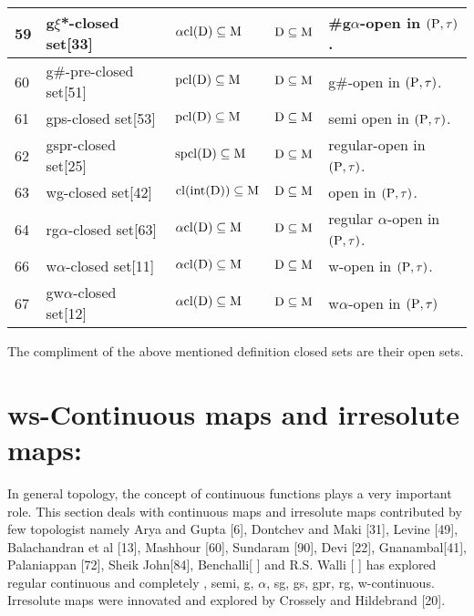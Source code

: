 {\begin{longtable}{|p{1cm}|>{\raggedright}p{5cm}|>{\centering}p{2.5cm}|>{\centering}p{1.7cm}|>{\centering}p{2.8cm}|}
\hline
59 & g$\xi$*-closed set[33]  & $\alpha\mathrm{cl}(\mathrm{D}) \subseteq \mathrm{M}$ & $\mathrm{D}  \subseteq  \mathrm{M}$ & \#g$\alpha$-open in $(\mathrm{P}, \tau)$.\tabularnewline
\hline
60 & g\#-pre-closed set[51] &  $\mathrm{pcl}(\mathrm{D}) \subseteq \mathrm{M}$ & $\mathrm{D}  \subseteq  \mathrm{M}$ & g\#-open in $(\mathrm{P}, \tau)$.\tabularnewline
\hline
61 & gps-closed set[53] & $\mathrm{pcl}(\mathrm{D}) \subseteq \mathrm{M}$ & $\mathrm{D}  \subseteq  \mathrm{M}$ & semi open in $(\mathrm{P}, \tau)$.\tabularnewline
\hline
62 & gspr-closed set[25]  & $\mathrm{spcl}(\mathrm{D}) \subseteq \mathrm{M}$ & $\mathrm{D}  \subseteq  \mathrm{M}$ & regular-open in $(\mathrm{P}, \tau)$.\tabularnewline
\hline
63 & wg-closed set[42]  & $\mathrm{cl}(\mbox{int}(\mathrm{D})) \subseteq \mathrm{M}$ & $\mathrm{D}  \subseteq  \mathrm{M}$ & open in $(\mathrm{P}, \tau)$.\tabularnewline
\hline
64 & rg$\alpha$-closed set[63]  & $\alpha\mathrm{cl}(\mathrm{D}) \subseteq \mathrm{M}$ & $\mathrm{D}  \subseteq  \mathrm{M}$ & regular $\alpha$-open in $(\mathrm{P}, \tau)$.\tabularnewline
\hline
66 & w$\alpha$-closed set[11]  & $\alpha\mathrm{cl}(\mathrm{D}) \subseteq \mathrm{M}$ & $\mathrm{D}  \subseteq  \mathrm{M}$ &  w-open in $(\mathrm{P}, \tau)$.\tabularnewline
\hline
67 & gw$\alpha$-closed set[12]  & $\alpha\mathrm{cl}(\mathrm{D}) \subseteq \mathrm{M}$ & $\mathrm{D}  \subseteq  \mathrm{M}$ & w$\alpha$-open in $(\mathrm{P}, \tau)$\tabularnewline
\hline
\end{longtable}}





The compliment of the above mentioned definition closed sets are their open sets.  


\section{ws-Continuous maps and irresolute maps:}

In general topology, the concept of continuous functions plays a very important role. This section deals with continuous maps and irresolute maps contributed by few topologist namely Arya and Gupta [6], Dontchev and Maki [31],  Levine [49], Balachandran et al [13], Mashhour [60], Sundaram [90], Devi [22], Gnanambal[41], Palaniappan [72], Sheik John[84], Benchalli[ ] and  R.S. Walli [ ] has explored regular continuous and completely ,  semi, g, $\alpha$, sg, gs, gpr, rg, w-continuous. Irresolute maps were innovated and explored by Crossely and Hildebrand [20].

